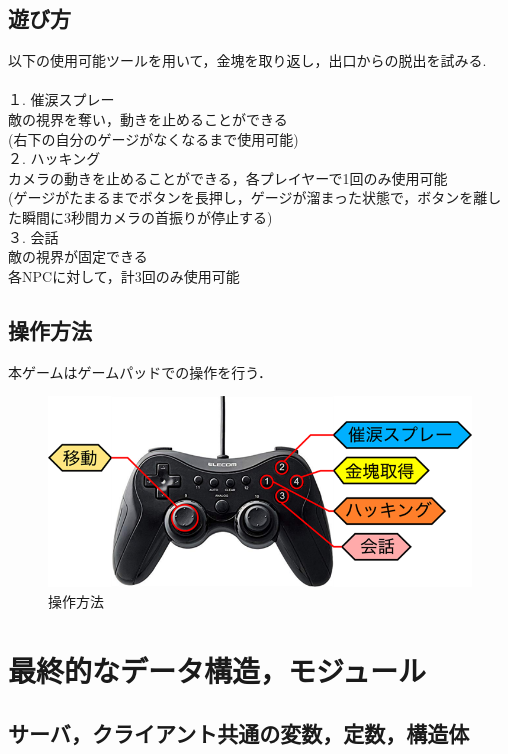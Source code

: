 \documentclass{jarticle}
\begin{document}
\subsection{遊び方}
以下の使用可能ツールを用いて，金塊を取り返し，出口からの脱出を試みる.\\\\
１.	催涙スプレー\\
敵の視界を奪い，動きを止めることができる\\
(右下の自分のゲージがなくなるまで使用可能)\\
２.	ハッキング\\
カメラの動きを止めることができる，各プレイヤーで1回のみ使用可能\\
(ゲージがたまるまでボタンを長押し，ゲージが溜まった状態で，ボタンを離した瞬間に3秒間カメラの首振りが停止する)\\
３.	会話\\
敵の視界が固定できる\\
各NPCに対して，計3回のみ使用可能\\



\subsection{操作方法}
本ゲームはゲームパッドでの操作を行う．

\begin{figure}[H]
\begin{center}
\includegraphics[width=\linewidth]{./zu/gamepad.png}
\caption{操作方法}
\label{fig:gamepad}
\end{center}
\end{figure}

\section{最終的なデータ構造，モジュール}
\subsection{サーバ，クライアント共通の変数，定数，構造体}
\end{document}
